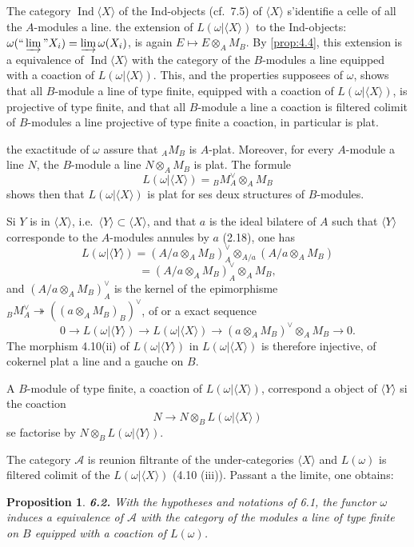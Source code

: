 \documentclass[12pt,a4paper]{article}
\theoremstyle{plain}
\newtheorem{proposition}[theorem]{Proposition}
\theoremstyle{definition}
\theoremstyle{remark}
\DeclareMathOperator{\Ind}{Ind}
\begin{document}
The category $\Ind\langle X \rangle$ of the Ind-objects (cf.~7.5) of $\langle X \rangle$ s'identifie a celle of all the $A$-modules a line. the extension of $L(\omega|\langle X \rangle)$ to the Ind-objects: $\omega(``\varinjlim" X_i) = \varinjlim \omega(X_i)$, is again $E \mapsto E \otimes_A M_B$. By \ref{prop:4.4}, this extension is a equivalence of $\Ind\langle X \rangle$ with the category of the $B$-modules a line equipped with a coaction of $L(\omega|\langle X \rangle)$. This, and the properties supposees of $\omega$, shows that all $B$-module a line of type finite, equipped with a coaction of $L(\omega|\langle X \rangle)$, is projective of type finite, and that all $B$-module a line a coaction is filtered colimit of $B$-modules a line projective of type finite a coaction, in particular is plat.

the exactitude of $\omega$ assure that ${}_A M_B$ is $A$-plat. Moreover, for every $A$-module a line $N$, the $B$-module a line $N \otimes_A M_B$ is plat. The formule
\[
L(\omega|\langle X \rangle) = {}_B M_A^\vee \otimes_A M_B
\]
shows then that $L(\omega|\langle X \rangle)$ is plat for ses deux structures of $B$-modules.

Si $Y$ is in $\langle X \rangle$, i.e.~$\langle Y \rangle \subset \langle X \rangle$, and that $a$ is the ideal bilatere of $A$ such that $\langle Y \rangle$ corresponde to the $A$-modules annules by $a$ (2.18), one has
\[
L(\omega|\langle Y \rangle) = (A/a \otimes_A M_B)_A^\vee \otimes_{A/a} (A/a \otimes_A M_B)
\]
\[
= (A/a \otimes_A M_B)_A^\vee \otimes_A M_B,
\]
and $(A/a \otimes_A M_B)_A^\vee$ is the kernel of the epimorphisme ${}_B M_A^\vee \twoheadrightarrow ((a \otimes_A M_B)_B)^\vee$, of or a exact sequence
\[
0 \to L(\omega|\langle Y \rangle) \to L(\omega|\langle X \rangle) \to (a \otimes_A M_B)^\vee \otimes_A M_B \to 0.
\]
The morphism 4.10(ii) of $L(\omega|\langle Y \rangle)$ in $L(\omega|\langle X \rangle)$ is therefore injective, of cokernel plat a line and a gauche on $B$.

A $B$-module of type finite, a coaction of $L(\omega|\langle X \rangle)$, correspond a object of $\langle Y \rangle$ si the coaction
\[
N \to N \otimes_B L(\omega|\langle X \rangle)
\]
se factorise by $N \otimes_B L(\omega|\langle Y \rangle)$.

The category $\mathcal{A}$ is reunion filtrante of the under-categories $\langle X \rangle$ and $L(\omega)$ is filtered colimit of the $L(\omega|\langle X \rangle)$ (4.10 (iii)). Passant a the limite, one obtains:

\begin{proposition}\label{prop:6.2}
\textbf{6.2.} With the hypotheses and notations of 6.1, the functor $\omega$ induces a equivalence of $\mathcal{A}$ with the category of the modules a line of type finite on $B$ equipped with a coaction of $L(\omega)$.
\end{proposition}
\end{document}
